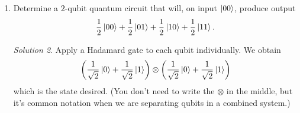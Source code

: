 \documentclass{article}
\theoremstyle{plain}
\theoremstyle{definition}
\theoremstyle{remark}
\newtheorem*{solution}{Solution}
\numberwithin{theorem}{section}
\begin{document}
\begin{enumerate}
\begin{solution}
		We use the same trick as for AND:  we use $x,y,z \mapsto x,y,z \oplus (x \vee y)$.  Then on the inputs $x,y,0$ it gives $x,y,x \vee y$.  That is, we have
\begin{align*}
|000\rangle &\mapsto |000 \rangle, \\
|010\rangle &\mapsto |011 \rangle,\\
|100\rangle &\mapsto |101 \rangle,\\
|110\rangle &\mapsto |111 \rangle,\\
|001\rangle &\mapsto |001 \rangle, \\
|011\rangle &\mapsto |010 \rangle,\\
|101\rangle &\mapsto |100 \rangle,\\
|111\rangle &\mapsto |110 \rangle.
\end{align*}
		As a matrix on the basis
		\[
			\ket{000}, \ket{001}, \ket{010}, \ket{011}, \ket{100}, \ket{101}, \ket{110}, \ket{111},
		\]
		this becomes 
		\[
			\begin{pmatrix}
				1 & 0 & 0 & 0 & 0 & 0 & 0 & 0 \\
				0 & 1 & 0 & 0 & 0 & 0 & 0 & 0 \\
				0 & 0 & 0 & 1 & 0 & 0 & 0 & 0 \\
				0 & 0 & 1 & 0 & 0 & 0 & 0 & 0 \\
				0 & 0 & 0 & 0 & 0 & 1 & 0 & 0 \\
				0 & 0 & 0 & 0 & 1 & 0 & 0 & 0 \\
				0 & 0 & 0 & 0 & 0 & 0 & 0 & 1 \\
				0 & 0 & 0 & 0 & 0 & 0 & 1 & 0
			\end{pmatrix}
		\]
		\end{solution}


	\item Determine a $2$-qubit quantum circuit that will, on input $\ket{00}$, produce output
		\[
			\frac{1}{2} \ket{00} + \frac{1}{2} \ket{01} + \frac{1}{2} \ket{10} + \frac{1}{2} \ket{11}.
			\]

				\begin{solution}

				Apply a Hadamard gate to each qubit individually.  We obtain
				\[
					\left( \frac{1}{\sqrt{2}}\ket{0} + \frac{1}{\sqrt{2}}\ket{1} \right)
					\otimes \left( \frac{1}{\sqrt{2}}\ket{0} + \frac{1}{\sqrt{2}}\ket{1} \right)
					\]
					which is the state desired.  (You don't need to write the $\otimes$ in the middle, but it's common notation when we are separating qubits in a combined system.)


\end{solution}
\end{enumerate}
\end{document}
